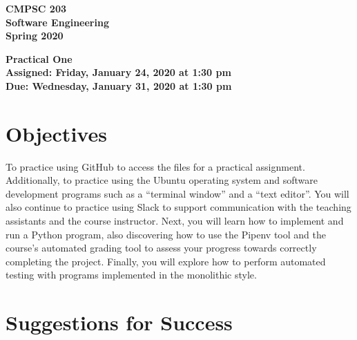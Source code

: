 \documentclass[11pt]{article}
\newcommand{\assignmentduedate}{January 31}
\newcommand{\assignmentassignedate}{January 24}
\newcommand{\assignmentnumber}{One}
\newcommand{\labyear}{2020}
\newcommand{\labdueday}{Wednesday}
\newcommand{\labassignday}{Friday}
\newcommand{\labtime}{1:30 pm}
\newcommand{\assigneddate}{Assigned: \labassignday, \assignmentassignedate, \labyear{} at \labtime{}}
\newcommand{\duedate}{Due: \labdueday, \assignmentduedate, \labyear{} at \labtime{}}
\newcommand{\labtitle}[1]
{
  \begin{center}
    \begin{center}
      \bf
      CMPSC 203\\Software Engineering\\
      Spring 2020\\
      \medskip
    \end{center}
    \bf
    #1
  \end{center}
}
\begin{document}
\thispagestyle{empty}

\labtitle{Practical \assignmentnumber{} \\ \assigneddate{} \\ \duedate{}}

\section*{Objectives}

To practice using GitHub to access the files for a practical assignment.
Additionally, to practice using the Ubuntu operating system and software
development programs such as a ``terminal window'' and a ``text editor''. You
will also continue to practice using Slack to support communication with the
teaching assistants and the course instructor. Next, you will learn how to
implement and run a Python program, also discovering how to use the Pipenv tool
and the course's automated grading tool to assess your progress towards
correctly completing the project. Finally, you will explore how to perform
automated testing with programs implemented in the monolithic style.

\section*{Suggestions for Success}
\end{document}
